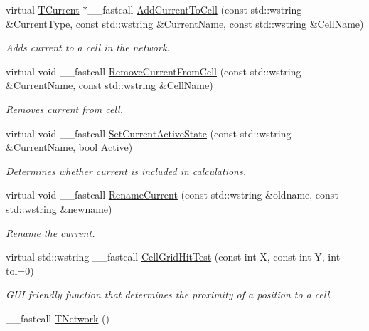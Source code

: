 \begin{DoxyCompactItemize}
virtual \hyperlink{class_t_current}{T\+Current} $\ast$\+\_\+\+\_\+fastcall \hyperlink{class_t_network_afd4e1483f03749ff479b3b5edfd94079}{Add\+Current\+To\+Cell} (const std\+::wstring \&Current\+Type, const std\+::wstring \&Current\+Name, const std\+::wstring \&Cell\+Name)
\begin{DoxyCompactList}\small\item\em Adds current to a cell in the network. \end{DoxyCompactList}\item 
virtual void \+\_\+\+\_\+fastcall \hyperlink{class_t_network_abfb4a743781ec3669a16404f5e4c3a35}{Remove\+Current\+From\+Cell} (const std\+::wstring \&Current\+Name, const std\+::wstring \&Cell\+Name)
\begin{DoxyCompactList}\small\item\em Removes current from cell. \end{DoxyCompactList}\item 
virtual void \+\_\+\+\_\+fastcall \hyperlink{class_t_network_ad1aaaa8e2b7afbe01087ece54b19e0ad}{Set\+Current\+Active\+State} (const std\+::wstring \&Current\+Name, bool Active)
\begin{DoxyCompactList}\small\item\em Determines whether current is included in calculations. \end{DoxyCompactList}\item 
virtual void \+\_\+\+\_\+fastcall \hyperlink{class_t_network_a435e422bce53a3e9dfb38271710aed4c}{Rename\+Current} (const std\+::wstring \&oldname, const std\+::wstring \&newname)
\begin{DoxyCompactList}\small\item\em Rename the current. \end{DoxyCompactList}\item 
virtual std\+::wstring \+\_\+\+\_\+fastcall \hyperlink{class_t_network_af2cad16d184fa37acbe7355ee00b384d}{Cell\+Grid\+Hit\+Test} (const int X, const int Y, int tol=0)
\begin{DoxyCompactList}\small\item\em G\+U\+I friendly function that determines the proximity of a position to a cell. \end{DoxyCompactList}\item 
\hypertarget{class_t_network_ac996464919d49a5aa5ec510369aab2be}{\+\_\+\+\_\+fastcall \hyperlink{class_t_network_ac996464919d49a5aa5ec510369aab2be}{T\+Network} ()}\label{class_t_network_ac996464919d49a5aa5ec510369aab2be}


\end{DoxyCompactItemize}
